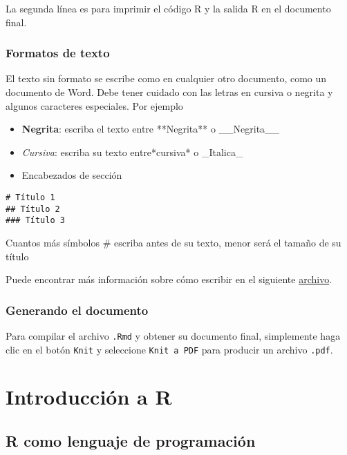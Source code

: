 \documentclass[
]{book}
\providecommand{\tightlist}{%
  \setlength{\itemsep}{0pt}\setlength{\parskip}{0pt}}
\begin{document}
La segunda línea es para imprimir el código R y la salida R en el documento final.

\hypertarget{formatos-de-texto}{%
\subsection{Formatos de texto}\label{formatos-de-texto}}

El texto sin formato se escribe como en cualquier otro documento, como un documento de Word. Debe tener cuidado con las letras en cursiva o negrita y algunos caracteres especiales. Por ejemplo

\begin{itemize}
\tightlist
\item
  \textbf{Negrita}: escriba el texto entre **Negrita** o \_\_Negrita\_\_
\item
  \emph{Cursiva}: escriba su texto entre*cursiva* o \_Italica\_
\item
  Encabezados de sección
\end{itemize}

\begin{verbatim}
# Título 1
## Título 2
### Título 3
\end{verbatim}

Cuantos más símbolos \# escriba antes de su texto, menor será el tamaño de su título

Puede encontrar más información sobre cómo escribir en el siguiente \href{https://rstudio.com/wp-content/uploads/2015/02/rmarkdown-cheatsheet.pdf}{archivo}.

\hypertarget{generando-el-documento}{%
\subsection{Generando el documento}\label{generando-el-documento}}

Para compilar el archivo \texttt{.Rmd} y obtener su documento final, simplemente haga clic en el botón \texttt{Knit} y seleccione \texttt{Knit\ a\ PDF} para producir un archivo \texttt{.pdf}.

\hypertarget{intro}{%
\chapter{Introducción a R}\label{intro}}

\hypertarget{r-como-lenguaje-de-programaciuxf3n}{%
\section{R como lenguaje de programación}\label{r-como-lenguaje-de-programaciuxf3n}}
\end{document}
